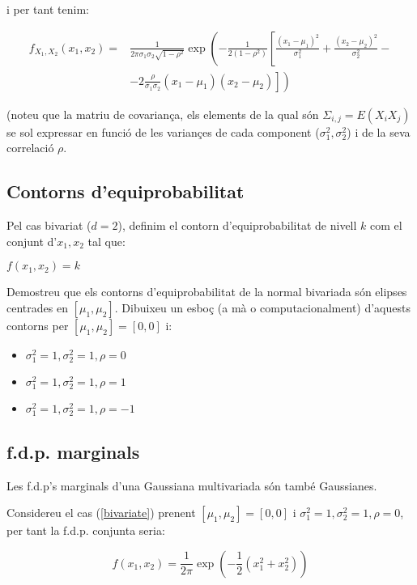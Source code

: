 \documentclass[10pt,a4paper]{article}
\begin{document}
i per tant tenim:

\begin{eqnarray}
f_{X_1, X_2}(x_1, x_2) =& \frac{1}{2\pi\sigma_1\sigma_2\sqrt{1 - \rho^2}}
\exp\left(-\frac{1}{2(1-\rho^2)}\left[\frac{(x_1 - \mu_1)^2}{\sigma_1^2} + \frac{(x_2 - \mu_2)^2}{\sigma_2^2}  - \right.\right.\\
& \left.\left.- 2 \frac{\rho}{\sigma_1\sigma_2}(x_1 - \mu_1) (x_2 - \mu_2)\right]\right)\nonumber
\end{eqnarray}

(noteu que la matriu de covariança, els elements de la qual són $\Sigma_{i,j} = E(X_i X_j)$ se sol expressar
en funció de les variançes de cada component ($\sigma_1^2,  \sigma_2^2$) i de la seva correlació $\rho$.

\subsection{Contorns d'equiprobabilitat}

Pel cas bivariat ($d=2$), definim el contorn d'equiprobabilitat de nivell $k$ com el conjunt d'$x_1, x_2$ tal que:

$f(x_1, x_2) = k$

Demostreu que els contorns d'equiprobabilitat de la normal bivariada són elipses 
centrades en $[\mu_1, \mu_2]$. Dibuixeu un esboç (a mà o computacionalment) d'aquests contorns per $[\mu_1, \mu_2] = [0,0]$ i:
\begin{itemize}
\item $\sigma_1^2 =1,  \sigma_2^2 =1 , \rho=0$
\item $\sigma_1^2 =1,  \sigma_2^2 =1 , \rho=1$
\item$\sigma_1^2 =1,  \sigma_2^2 =1 , \rho=-1$
\end{itemize}


\subsection{f.d.p. marginals}

Les f.d.p's marginals d'una Gaussiana multivariada són també Gaussianes. 

Considereu el cas (\ref{bivariate}) prenent $[\mu_1, \mu_2] = [0,0]$ i $\sigma_1^2 =1,  \sigma_2^2 =1 , \rho=0$, per tant la f.d.p. conjunta seria:

\begin{equation}
f(x_1, x_2) = \frac{1}{2\pi} \exp\left(-\frac{1}{2}\left(x_1^2 + x_2^2 \right)\right)
\end{equation}
\end{document}
